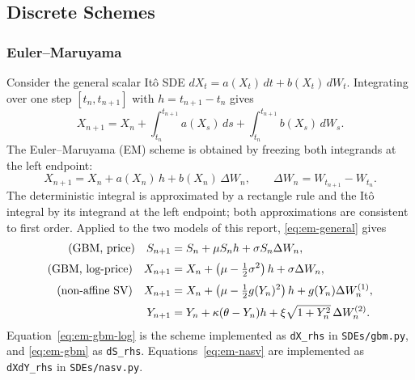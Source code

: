 \documentclass[11pt,a4paper]{article}
\theoremstyle{definition}
\theoremstyle{remark}
\begin{document}
\subsection{Discrete Schemes}
\label{sec:schemes}
\subsubsection{Euler--Maruyama}
Consider the general scalar It\^o SDE $dX_t = a(X_t)\,dt + b(X_t)\,dW_t$. Integrating over one step $[t_n, t_{n+1}]$ with $h = t_{n+1} - t_n$ gives
\begin{equation}
    X_{n+1} = X_n + \int_{t_n}^{t_{n+1}} a(X_s)\, ds + \int_{t_n}^{t_{n+1}} b(X_s)\, dW_s .
    \label{eq:integral-form}
\end{equation}
The Euler--Maruyama (EM) scheme is obtained by freezing both integrands at the left endpoint:
\begin{equation}
    X_{n+1} = X_n + a(X_n)\, h + b(X_n)\, \Delta W_n,
    \qquad \Delta W_n = W_{t_{n+1}} - W_{t_n} .
    \label{eq:em-general}
\end{equation}
The deterministic integral is approximated by a rectangle rule and the It\^o integral by its integrand at the left endpoint; both approximations are consistent to first order.
Applied to the two models of this report, \eqref{eq:em-general} gives
\begin{align}
    \text{(GBM, price)} \quad
    S_{n+1} &= S_n + \mu S_n h + \sigma S_n \Delta W_n,
    \label{eq:em-gbm} \\[2pt]
    \text{(GBM, log-price)} \quad
    X_{n+1} &= X_n + \left( \mu - \tfrac12 \sigma^2 \right) h + \sigma \Delta W_n,
    \label{eq:em-gbm-log} \\[2pt]
    \text{(non-affine SV)} \quad
    X_{n+1} &= X_n + \left( \mu - \tfrac12 g(Y_n)^2 \right) h + g(Y_n) \Delta W_n^{(1)}, \notag \\[2pt]
    Y_{n+1} &= Y_n + \kappa (\theta - Y_n) h + \xi \sqrt{1 + Y_n^{2}}\, \Delta W_n^{(2)} .
    \label{eq:em-nasv}
\end{align}
Equation~\eqref{eq:em-gbm-log} is the scheme implemented as \texttt{dX\_rhs} in \texttt{SDEs/gbm.py}, and \eqref{eq:em-gbm} as \texttt{dS\_rhs}. Equations~\eqref{eq:em-nasv} are implemented as \texttt{dXdY\_rhs} in \texttt{SDEs/nasv.py}.
\end{document}
